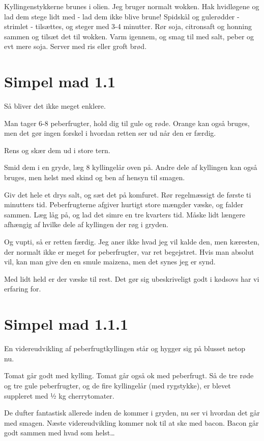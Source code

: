 \documentclass[
]{book}
\begin{document}
Kyllingenstykkerne brunes i olien. Jeg bruger normalt wokken.
Hak hvidløgene og lad dem stege lidt med - lad dem ikke blive brune!
Spidskål og gulerødder - strimlet - tilsættes, og steger med 3-4 minutter.
Rør soja, citronsaft og honning sammen og tilsæt det til wokken.
Varm igennem, og smag til med salt, peber og evt mere soja.
Server med ris eller groft brød.

\section{Simpel mad 1.1}\label{simpel-mad-1.1}

Så bliver det ikke meget enklere.

Man tager 6-8 peberfrugter, hold dig til gule og røde. Orange kan også bruges, men det gør ingen forskel i hvordan retten ser ud når den er færdig.

Rens og skær dem ud i store tern.

Smid dem i en gryde, læg 8 kyllingelår oven på. Andre dele af kyllingen kan også bruges, men helst med skind og ben af hensyn til smagen.

Giv det hele et drys salt, og sæt det på komfuret. Rør regelmæssigt de første ti minutters tid. Peberfrugterne afgiver hurtigt store mængder væske, og falder sammen. Læg låg på, og lad det simre en tre kvarters tid. Måske lidt længere afhængig af hvilke dele af kyllingen der røg i gryden.

Og vupti, så er retten færdig. Jeg aner ikke hvad jeg vil kalde den, men kæresten, der normalt ikke er meget for peberfrugter, var ret begejstret. Hvis man absolut vil, kan man give den en smule maizena, men det synes jeg er synd.

Med lidt held er der væske til rest. Det gør sig ubeskriveligt godt i kødsovs har vi erfaring for.

\section{Simpel mad 1.1.1}\label{simpel-mad-1.1.1}

En videreudvikling af peberfrugtkyllingen står og hygger sig på blusset netop nu.~

Tomat går godt med kylling. Tomat går også ok med peberfrugt. Så de tre røde og tre gule peberfrugter, og de fire kyllingelår (med rygstykke), er blevet suppleret med ½ kg cherrytomater.

De dufter fantastisk allerede inden de kommer i gryden, nu ser vi hvordan det går med smagen. Næste videreudvikling kommer nok til at ske med bacon. Bacon går godt sammen med hvad som helst\ldots{}
\end{document}

